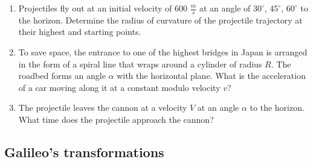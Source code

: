\documentclass{article}
\begin{document}
\begin{enumerate}[label=1.3.\arabic*]
\item Projectiles fly out at an initial velocity of $600$ $\frac{m}{s}$ at an angle of $30^\circ$, $45^\circ$, $60^\circ$ to the horizon. Determine the radius of curvature of the projectile trajectory at their highest and starting points.

\item To save space, the entrance to one of the highest bridges in Japan is arranged in the form of a spiral line that wraps around a cylinder of radius $R$. The roadbed forms an angle $\alpha$ with the horizontal plane. What is the acceleration of a car moving along it at a constant modulo velocity $v$?

\item The projectile leaves the cannon at a velocity $V$ at an angle $\alpha$ to the horizon. What time does the projectile approach the cannon?



\end{enumerate}


\subsection{Galileo's transformations}
\end{document}
